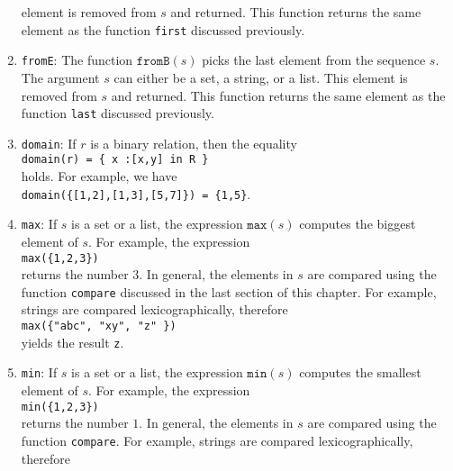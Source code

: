 \begin{enumerate}
      element is 
      removed from $s$ and returned.  This function returns the same element as the
      function \texttt{first} discussed previously.
\item \texttt{fromE}: The function $\texttt{fromB}(s)$ picks the last element from the
      sequence $s$.  The argument $s$ can either be a set, a string, or a list.  This element is
      removed from $s$ and returned.  This function returns the same element as the
      function \texttt{last} discussed previously.
\item \texttt{domain}: If $r$ is a binary relation, then the equality
      \\[0.2cm]
      \hspace*{1.3cm}
      \texttt{domain(r) = \{ x :[x,y] in R \}}
      \\[0.2cm]
      holds.  For example, we have
      \\[0.2cm]
      \hspace*{1.3cm}
      \texttt{domain(\{[1,2],[1,3],[5,7]\}) = \{1,5\}}.
\item \texttt{max}:  If $s$ is a set or a list, the expression $\mathtt{max}(s)$ computes the biggest
      element of $s$.  For example, the expression
      \\[0.2cm]
      \hspace*{1.3cm}
      \texttt{max(\{1,2,3\})}
      \\[0.2cm]
      returns the number $3$.  In general, the elements in $s$ are compared using the function
      \texttt{compare} discussed in the last section of this chapter.  For example, strings are compared
      lexicographically, therefore 
      \\[0.2cm]
      \hspace*{1.3cm}
      \texttt{max(\{"abc", "xy", "z" \})}
      \\[0.2cm]
      yields the result \texttt{z}.
\item \texttt{min}:  If $s$ is a set or a list, the expression $\mathtt{min}(s)$ computes the smallest
      element of $s$.  For example, the expression
      \\[0.2cm]
      \hspace*{1.3cm}
      \texttt{min(\{1,2,3\})}
      \\[0.2cm]
      returns the number $1$.  In general, the elements in $s$ are compared using the function
      \texttt{compare}.  For example, strings are compared
      lexicographically, therefore 
      \\[0.2cm]

\end{enumerate}
